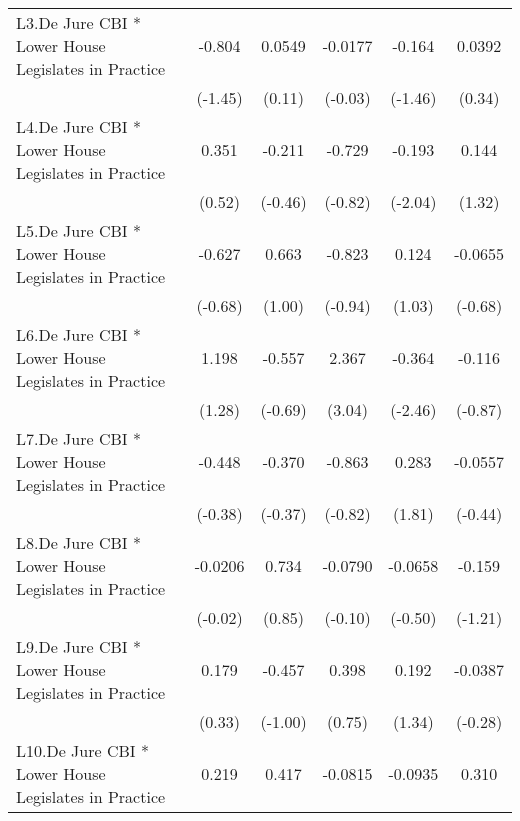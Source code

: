 {\begin{longtable}{l*{5}{c}}
\addlinespace
L3.De Jure CBI * Lower House Legislates in Practice&   -0.804         &   0.0549         &  -0.0177         &   -0.164         &   0.0392         \\
                &  (-1.45)         &   (0.11)         &  (-0.03)         &  (-1.46)         &   (0.34)         \\
\addlinespace
L4.De Jure CBI * Lower House Legislates in Practice&    0.351         &   -0.211         &   -0.729         &   -0.193\sym{*}  &    0.144         \\
                &   (0.52)         &  (-0.46)         &  (-0.82)         &  (-2.04)         &   (1.32)         \\
\addlinespace
L5.De Jure CBI * Lower House Legislates in Practice&   -0.627         &    0.663         &   -0.823         &    0.124         &  -0.0655         \\
                &  (-0.68)         &   (1.00)         &  (-0.94)         &   (1.03)         &  (-0.68)         \\
\addlinespace
L6.De Jure CBI * Lower House Legislates in Practice&    1.198         &   -0.557         &    2.367\sym{**} &   -0.364\sym{*}  &   -0.116         \\
                &   (1.28)         &  (-0.69)         &   (3.04)         &  (-2.46)         &  (-0.87)         \\
\addlinespace
L7.De Jure CBI * Lower House Legislates in Practice&   -0.448         &   -0.370         &   -0.863         &    0.283         &  -0.0557         \\
                &  (-0.38)         &  (-0.37)         &  (-0.82)         &   (1.81)         &  (-0.44)         \\
\addlinespace
L8.De Jure CBI * Lower House Legislates in Practice&  -0.0206         &    0.734         &  -0.0790         &  -0.0658         &   -0.159         \\
                &  (-0.02)         &   (0.85)         &  (-0.10)         &  (-0.50)         &  (-1.21)         \\
\addlinespace
L9.De Jure CBI * Lower House Legislates in Practice&    0.179         &   -0.457         &    0.398         &    0.192         &  -0.0387         \\
                &   (0.33)         &  (-1.00)         &   (0.75)         &   (1.34)         &  (-0.28)         \\
\addlinespace
L10.De Jure CBI * Lower House Legislates in Practice&    0.219         &    0.417         &  -0.0815         &  -0.0935         &    0.310         \\

\end{longtable}}
